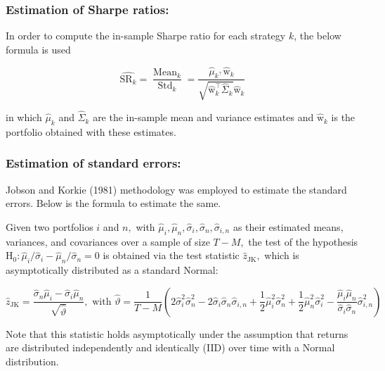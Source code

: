 \documentclass[11pt]{article}
\begin{document}
\subsubsection{Estimation of Sharpe ratios:}
In order to compute the in-sample Sharpe ratio for each strategy $k$, the below formula is used

\begin{equation} \label{eq:eq4}
\widehat{\mathrm{SR}_{k}}=\frac{\operatorname{Mean}_{k}}{\operatorname{Std}_{k}}=\frac{\hat{\mu}_{k^{\top}} \hat{\mathrm{w}}_{k}}{\sqrt{\hat{\mathrm{w}}_{k}^{\top} \hat{\Sigma}_{k}} \hat{\mathrm{w}}_{k}}
\end{equation}

in which $\hat{\mu}_{k}$ and $\hat{\Sigma}_{k}$ are the in-sample mean and variance estimates and $\hat{\mathrm{w}}_{k}$ is the portfolio obtained with these estimates.

\subsubsection{Estimation of standard errors:}
Jobson and Korkie (1981) methodology was employed to estimate the standard errors. Below is the formula to estimate the same.

Given two portfolios $i$ and $n,$ with $\hat{\mu}_{i}, \hat{\mu}_{n}, \hat{\sigma}_{i}, \hat{\sigma}_{n}, \hat{\sigma}_{i, n}$ as their estimated means, variances, and covariances over a sample of size $T-M,$ the test of the hypothesis $\mathrm{H}_{0}: \hat{\mu}_{i} / \hat{\sigma}_{i}-\hat{\mu}_{n} / \hat{\sigma}_{n}=0$ is obtained via the test statistic $\hat{z}_{\mathrm{JK}},$ which is asymptotically distributed as a standard Normal:

\begin{equation} \label{eq:eq5}
\hat{z}_{\mathrm{JK}}=\frac{\hat{\sigma}_{n} \hat{\mu}_{i}-\hat{\sigma}_{i} \hat{\mu}_{n}}{\sqrt{\hat{\vartheta}}}, \text { with } \hat{\vartheta}=\frac{1}{T-M}\left(2 \hat{\sigma}_{i}^{2} \hat{\sigma}_{n}^{2}-2 \hat{\sigma}_{i} \hat{\sigma}_{n} \hat{\sigma}_{i, n}+\frac{1}{2} \hat{\mu}_{i}^{2} \hat{\sigma}_{n}^{2}+\frac{1}{2} \hat{\mu}_{n}^{2} \hat{\sigma}_{i}^{2}-\frac{\hat{\mu}_{i} \hat{\mu}_{n}}{\hat{\sigma}_{i} \hat{\sigma}_{n}} \hat{\sigma}_{i, n}^{2}\right)
\end{equation}

Note that this statistic holds asymptotically under the assumption that returns are distributed independently and identically (IID) over time with a Normal distribution.
\end{document}
